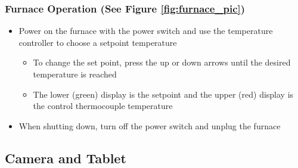\documentclass[letterpaper,11pt]{article}
\begin{document}
\subsubsection{Furnace Operation (See Figure \ref{fig:furnace_pic})}
      \begin{itemize}
      \item Power on the furnace with the power switch and use the temperature
            controller to choose a setpoint temperature
        \begin{itemize}
            \item To change the set point, press the up or down     arrows until 
                the desired temperature is reached
            \item The lower (green) display is the setpoint and     the upper 
                (red) display is the control thermocouple temperature
        \end{itemize}
        
        \item When shutting down, turn off the power switch and unplug the furnace
        \end{itemize}

        
    \subsection{Camera and Tablet} \label{sec:cam_tab}
\end{document}
